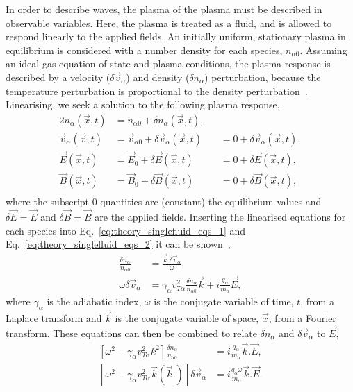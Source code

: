 In order to describe waves, the plasma of the plasma must be described in observable variables.
Here, the plasma is treated as a fluid, and is allowed to respond linearly to the applied fields.
An initially uniform, stationary plasma in equilibrium is considered with a number density for each species, $n_{\alpha 0}$.
Assuming an ideal gas equation of state and plasma conditions, the plasma response is described by a velocity ($\delta \vec{v}_\alpha$) and density ($\delta n_\alpha$) perturbation, because the temperature perturbation is proportional to the density perturbation~\cite{michel_introduction_2023}.
Linearising, we seek a solution to the following plasma response,
\begin{alignat}{2}
    n_\alpha(\vec{x},t) &= n_{\alpha 0} + \delta n_\alpha(\vec{x},t),&&\\
    \vec{v}_\alpha(\vec{x},t) &= \vec{v}_{\alpha 0} + \delta \vec{v}_\alpha(\vec{x},t) &&= 0 + \delta \vec{v}_\alpha(\vec{x},t),\\
    \vec{E}(\vec{x},t) &= \vec{E}_{0} + \delta \vec{E}(\vec{x},t) &&= 0 + \delta \vec{E}(\vec{x},t),\\
    \vec{B}(\vec{x},t) &= \vec{B}_{0} + \delta \vec{B}(\vec{x},t) &&= 0 + \delta \vec{B}(\vec{x},t),\\
\end{alignat}
where the subscript 0 quantities are (constant) the equilibrium values and $\delta\vec{E}=\vec{E}$ and $\delta\vec{B}=\vec{B}$ are the applied fields.
Inserting the linearised equations for each species into Eq.~\ref{eq:theory_singlefluid_eqs_1} and Eq.~\ref{eq:theory_singlefluid_eqs_2} it can be shown~\cite{michel_introduction_2023},
\begin{align}
    \label{eq:theory_wave1s_1}
    \frac{\delta n_\alpha}{n_{\alpha 0}} &= \frac{\vec{k}.\delta\vec{v}_\alpha}{\omega},\\
    \label{eq:theory_wave1s_2}
    \omega \delta\vec{v}_\alpha &= \gamma_\alpha v_{T\alpha}^2 \frac{\delta n_\alpha}{n_{\alpha 0}} \vec{k} + i\frac{q_\alpha}{m_\alpha}\vec{E},
\end{align}
where $\gamma_\alpha$ is the adiabatic index, $\omega$ is the conjugate variable of time, $t$, from a Laplace transform and $\vec{k}$ is the conjugate variable of space, $\vec{x}$, from a Fourier transform.
These equations can then be combined to relate $\delta n_\alpha$ and $\delta \vec{v}_\alpha$ to $\vec{E}$,
\begin{align}
    \label{eq:theory_wave2s_1}
    \left[ \omega^2 - \gamma_\alpha v_{T\alpha}^2 k^2 \right]\frac{\delta n_\alpha}{n_{\alpha 0}} &= i \frac{q_\alpha}{m_\alpha} \vec{k}.\vec{E},\\
    \label{eq:theory_wave2s_2}
    \left[ \omega^2 - \gamma_\alpha v_{T\alpha}^2 \vec{k}(\vec{k}.) \right]\delta \vec{v}_\alpha &= i \frac{q_\alpha \omega}{m_\alpha} \vec{k}.\vec{E}.
\end{align}
